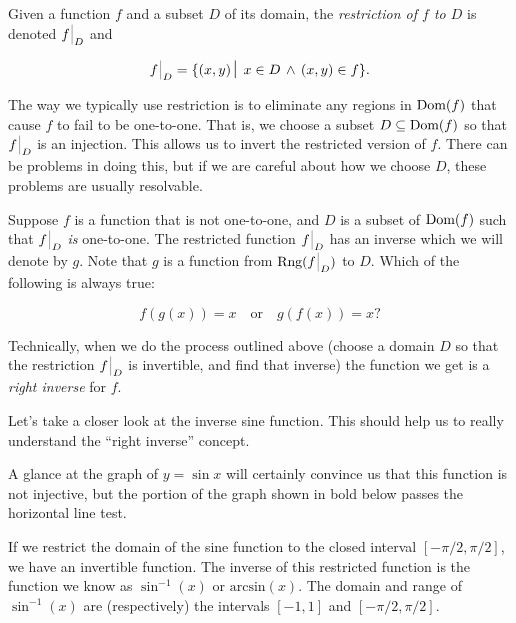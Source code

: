 \begin{defi}
Given a function $f$ and a subset $D$ of its domain, the
\emph{restriction of $f$ to $D$} is denoted $\restrict{f}{D}$ and

\[ \restrict{f}{D} = \{ (x,y) \suchthat \; x \in D \, \land \, (x,y) \in f \}. \]
\end{defi}

The way we typically use restriction is to eliminate any regions in
$\mbox{Dom}(f)$ that cause $f$ to fail to be one-to-one.   That is, we
choose a subset $D \subseteq \mbox{Dom}(f)$ so that $\restrict{f}{D}$ is an injection.
This allows us to invert the restricted version of $f$.  There can be
problems in doing this, but if we are careful about how we choose $D$,
these problems are usually resolvable.

\begin{exer}
Suppose $f$ is a function that is not one-to-one, and $D$ is a subset
of $\mbox{Dom}(f)$ such that $\restrict{f}{D}$ \emph{is} one-to-one.  The restricted
function $\restrict{f}{D}$ has an inverse which we will denote by $g$.  
Note that $g$ is a function from $\Rng{\restrict{f}{D}}$ to $D$.  Which
of the following is always true:

\[ f(g(x)) = x \quad \mbox{or} \quad g(f(x)) = x ? \]
\end{exer}

Technically, when we do the process outlined above (choose a domain
$D$ so that the restriction $\restrict{f}{D}$ is invertible, and 
find that inverse)
the function we get is a \emph{right inverse} for $f$.

Let's take a closer look at the inverse sine function.  This should 
help us to really understand the ``right inverse'' concept.  

A glance at the graph of $y = \sin{x}$ will certainly convince us that 
this function is not injective, but the portion of the graph shown 
in bold below passes the horizontal line test.

\begin{center}

\end{center}

If we restrict the domain of the sine function to the closed interval 
$[-\pi/2, \pi/2]$, we have an invertible function.  The inverse of this
restricted function is the function we know as $\sin^{-1}(x)$ or 
$\mbox{arcsin}(x)$.  The domain and range of $\sin^{-1}(x)$ are 
(respectively) the intervals
$[-1,1]$ and $[-\pi/2, \pi/2]$.  


